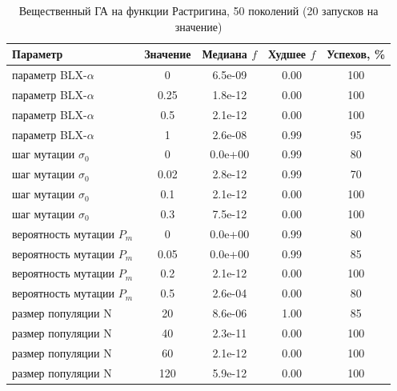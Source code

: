 \begin{table}[H]
\caption{Вещественный ГА на функции Растригина, 50 поколений (20 запусков на значение)}
\label{tab:realparams}
\centering
\small
\begin{tabular}{lcccc}
\toprule
Параметр & Значение & Медиана $f$ & Худшее $f$ & Успехов, \% \\
\midrule
параметр BLX-$\alpha$ & 0 & 6.5e-09 & 0.00 & 100 \\
параметр BLX-$\alpha$ & 0.25 & 1.8e-12 & 0.00 & 100 \\
параметр BLX-$\alpha$ & 0.5 & 2.1e-12 & 0.00 & 100 \\
параметр BLX-$\alpha$ & 1 & 2.6e-08 & 0.99 & 95 \\
шаг мутации $\sigma_0$ & 0 & 0.0e+00 & 0.99 & 80 \\
шаг мутации $\sigma_0$ & 0.02 & 2.8e-12 & 0.99 & 70 \\
шаг мутации $\sigma_0$ & 0.1 & 2.1e-12 & 0.00 & 100 \\
шаг мутации $\sigma_0$ & 0.3 & 7.5e-12 & 0.00 & 100 \\
вероятность мутации $P_m$ & 0 & 0.0e+00 & 0.99 & 80 \\
вероятность мутации $P_m$ & 0.05 & 0.0e+00 & 0.99 & 85 \\
вероятность мутации $P_m$ & 0.2 & 2.1e-12 & 0.00 & 100 \\
вероятность мутации $P_m$ & 0.5 & 2.6e-04 & 0.00 & 80 \\
размер популяции N & 20 & 8.6e-06 & 1.00 & 85 \\
размер популяции N & 40 & 2.3e-11 & 0.00 & 100 \\
размер популяции N & 60 & 2.1e-12 & 0.00 & 100 \\
размер популяции N & 120 & 5.9e-12 & 0.00 & 100 \\
\bottomrule
\end{tabular}
\end{table}
